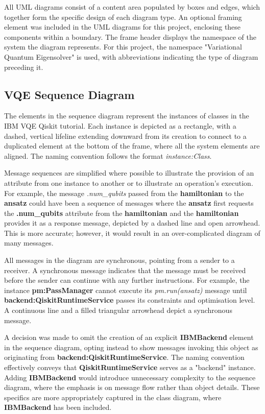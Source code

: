 \documentclass{article}
\begin{document}
All UML diagrams consist of a content area populated by boxes and edges, which together form the specific design of each diagram type. An optional framing element was included in the UML diagrams for this project, enclosing these components within a boundary. The frame header displays the namespace of the system the diagram represents\cite{UMLElementFrame}. For this project, the namespace "Variational Quantum Eigensolver" is used, with abbreviations indicating the type of diagram preceding it. 

\subsection{VQE Sequence Diagram}

The elements in the sequence diagram represent the instances of classes in the IBM VQE Qiskit tutorial. Each instance is depicted as a rectangle, with a dashed, vertical lifeline extending downward from its creation to connect to a duplicated element at the bottom of the frame, where all the system elements are aligned. The naming convention follows the format \textit{instance:Class}.

Message sequences are simplified where possible to illustrate the provision of an attribute from one instance to another or to illustrate an operation's execution. For example, the message \textit{.num\_qubits} passed from the \textbf{hamiltonian} to the \textbf{ansatz} could have been a sequence of messages where the \textbf{ansatz} first requests the \textbf{.num\_qubits} attribute from the \textbf{hamiltonian} and the \textbf{hamiltonian} provides it as a response message, depicted by a dashed line and open arrowhead. This is more accurate; however, it would result in an over-complicated diagram of many messages. 

All messages in the diagram are synchronous, pointing from a sender to a receiver. A synchronous message indicates that the message must be received before the sender can continue with any further instructions\cite{Seidl_Scholz_Huemer_Kappel_Duffy_2014}. For example, the instance \textbf{pm:PassManager} cannot execute its \textit{pm.run(ansatz)} message until \textbf{backend:QiskitRuntimeService} passes its constraints and optimisation level. A continuous line and a filled triangular arrowhead depict a synchronous message.

A decision was made to omit the creation of an explicit \textbf{IBMBackend} element in the sequence diagram, opting instead to show messages invoking this object as originating from \textbf{backend:QiskitRuntimeService}.
The naming convention effectively conveys that \textbf{QiskitRuntimeService} serves as a "backend" instance. Adding \textbf{IBMBackend} would introduce unnecessary complexity to the sequence diagram, where the emphasis is on message flow rather than object details. These specifics are more appropriately captured in the class diagram, where \textbf{IBMBackend} has been included.
\end{document}
